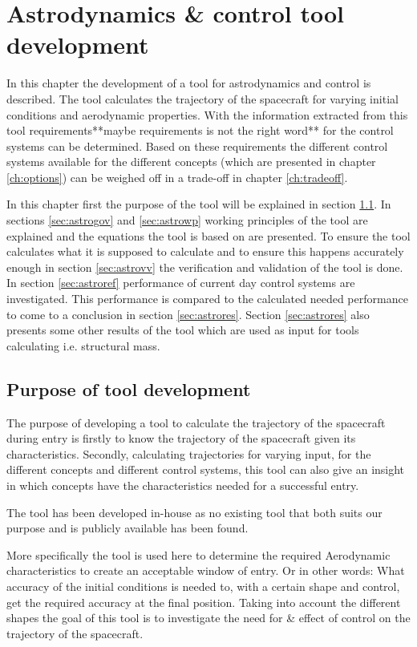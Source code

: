 \section{Astrodynamics \& control tool development}
\label{ch:astrocontrol}
In this chapter the development of a tool for astrodynamics and control is described. The tool calculates the trajectory of the spacecraft for varying initial conditions and aerodynamic properties. With the information extracted from this tool requirements**maybe requirements is not the right word** for the control systems can be determined. Based on these requirements the different control systems available for the different concepts (which are presented in chapter \ref{ch:options}) can be weighed off in a trade-off in chapter \ref{ch:tradeoff}.

In this chapter first the purpose of the tool will be explained in section \ref{sec:astropurpose}. In sections \ref{sec:astrogov} and \ref{sec:astrowp} working principles of the tool are explained and the equations the tool is based on are presented. To ensure the tool calculates what it is supposed to calculate and to ensure this happens accurately enough in section \ref{sec:astrovv} the verification and validation of the tool is done. In section \ref{sec:astroref} performance of current day control systems are investigated. This performance is compared to the calculated needed performance to come to a conclusion in section \ref{sec:astrores}. Section \ref{sec:astrores} also presents some other results of the tool which are used as input for tools calculating i.e. structural mass.

\subsection{Purpose of tool development}
\label{sec:astropurpose}
The purpose of developing a tool to calculate the trajectory of the spacecraft during entry is firstly to know the trajectory of the spacecraft given its characteristics. Secondly, calculating trajectories for varying input, for the different concepts and different control systems, this tool can also give an insight in which concepts have the characteristics needed for a successful entry.

The tool has been developed in-house as no existing tool that both suits our purpose and is publicly available has been found.

More specifically the tool is used here to determine the required Aerodynamic characteristics to create an acceptable window of entry. Or in other words: What accuracy of the initial conditions is needed to, with a certain shape and control, get the required accuracy at the final position. Taking into account the different shapes the goal of this tool is to investigate the need for \& effect of control on the trajectory of the spacecraft.

